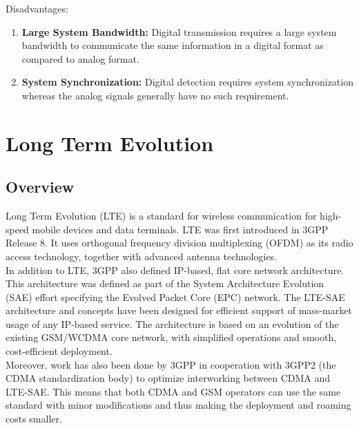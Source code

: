 Disadvantages:

\begin{enumerate}

  \item \textbf{Large System Bandwidth:} Digital transmission requires a large system
  bandwidth to communicate the same information in a digital format as compared to
  analog format.

  \item \textbf{System Synchronization:} Digital detection requires system synchronization
  whereas the analog signals generally have no such requirement.

\end{enumerate}


\section{Long Term Evolution} %
\label{let:lte}

\subsection{Overview}

Long Term Evolution (LTE) is a standard for wireless communication for high-speed
mobile devices and data terminals. LTE was first introduced in 3GPP Release 8.
It uses orthogonal frequency division multiplexing (OFDM) as its radio access
technology, together with advanced antenna technologies.\\

In addition to LTE, 3GPP also defined IP-based, flat core network architecture.
This architecture was defined as part of the System Architecture Evolution (SAE)
effort specifying the Evolved Packet Core (EPC) network. The LTE-SAE architecture
and concepts have been designed for efficient support of mass-market usage of any
IP-based service. The architecture is based on an evolution of the existing GSM/WCDMA
core network, with simplified operations and smooth, cost-efficient deployment.\\

Moreover, work has also been done by 3GPP in cooperation with 3GPP2 (the CDMA
standardization body) to optimize interworking between CDMA and LTE-SAE. This means
that both CDMA and GSM operators can use the same standard with minor modifications
and thus making the deployment and roaming costs smaller.\\

